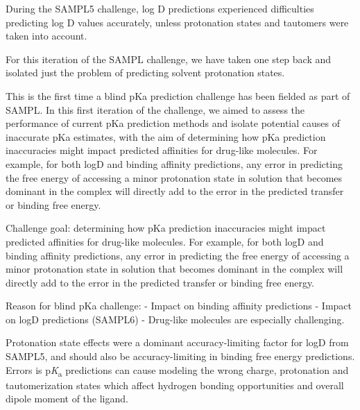 \documentclass[9pt,lineno]{elife}
\newcommand{\pKa}{p\textit{K}\textsubscript{a}}
\begin{document}
During the SAMPL5 challenge, log D predictions experienced difficulties predicting log D values accurately, unless protonation states and tautomers were taken into account.

For this iteration of the SAMPL challenge, we have taken one step back and isolated just the problem of predicting solvent protonation states.

This is the first time a blind pKa prediction challenge has been fielded as part of SAMPL. 
In this first iteration of the challenge, we aimed to assess the performance of current pKa prediction methods and isolate potential causes of inaccurate pKa estimates, with the aim of determining how pKa prediction inaccuracies might impact predicted affinities for drug-like molecules. 
For example, for both logD and binding affinity predictions, any error in predicting the free energy of accessing a minor protonation state in solution that becomes dominant in the complex will directly add to the error in the predicted transfer or binding free energy. 

Challenge goal: determining how pKa prediction inaccuracies might impact predicted affinities for drug-like molecules. For example, for both logD and binding affinity predictions, any error in predicting the free energy of accessing a minor protonation state in solution that becomes dominant in the complex will directly add to the error in the predicted transfer or binding free energy. 

Reason for blind pKa challenge:
- Impact on binding affinity predictions
- Impact on logD predictions (SAMPL6)
- Drug-like molecules are especially challenging.




Protonation state effects were a dominant accuracy-limiting factor for logD from SAMPL5, and should also be accuracy-limiting in binding free energy predictions.
Errors is \pKa{} predictions can cause modeling the wrong charge, protonation and tautomerization states which affect hydrogen bonding opportunities and overall dipole moment of the ligand.


\end{document}
